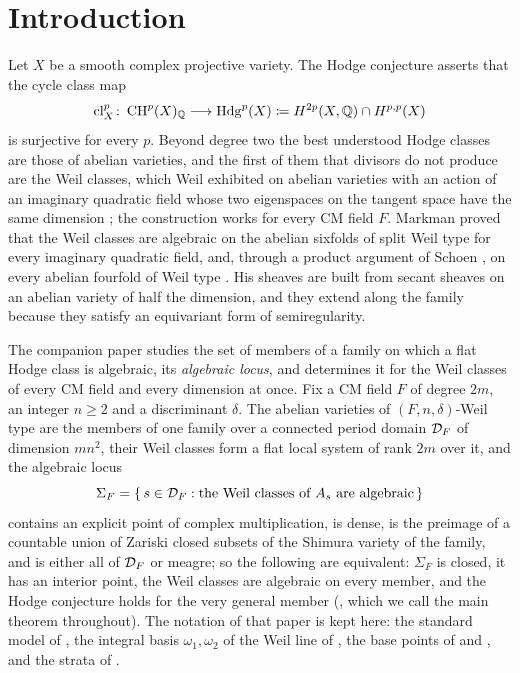 \section{Introduction}\label{sec:intro}

Let $X$ be a smooth complex projective variety. The Hodge conjecture asserts
that the cycle class map
\[
  \mathrm{cl}^{p}_{X}\colon \operatorname{CH}^{p}(X)_{\mathbb{Q}}\longrightarrow \mathrm{Hdg}^{p}(X)
  \coloneqq H^{2p}(X,\mathbb{Q})\cap H^{p,p}(X)
\]
is surjective for every $p$. Beyond degree two the best understood Hodge
classes are those of abelian varieties, and the first of them that divisors
do not produce are the Weil classes, which Weil exhibited on abelian
varieties with an action of an imaginary quadratic field whose two
eigenspaces on the tangent space have the same dimension \cite{Weil77}; the
construction works for every CM field $F$. Markman proved that the Weil
classes are algebraic on the abelian sixfolds of split Weil type for every
imaginary quadratic field, and, through a product argument of Schoen
\cite[Proposition~10]{Sch98}, on every abelian fourfold of Weil type
\cite{Mar25a,Mar25b}. His sheaves are built from secant sheaves on an abelian
variety of half the dimension, and they extend along the family because they
satisfy an equivariant form of semiregularity.

The companion paper \cite{paperI} studies the set of members of a family on
which a flat Hodge class is algebraic, its \emph{algebraic locus}, and
determines it for the Weil classes of every CM field and every dimension at
once. Fix a CM field $F$ of degree $2m$, an integer $n\ge2$ and a
discriminant $\delta$. The abelian varieties of $(F,n,\delta)$-Weil type are
the members of one family over a connected period domain $\mathcal{D}_{F}$ of
dimension $mn^{2}$, their Weil classes form a flat local system of rank $2m$
over it, and the algebraic locus
\[
  \Sigma_{F}=\{\,s\in\mathcal{D}_{F}:\text{the Weil classes of }A_{s}\text{ are
  algebraic}\,\}
\]
contains an explicit point of complex multiplication, is dense, is the
preimage of a countable union of Zariski closed subsets of the Shimura
variety of the family, and is either all of $\mathcal{D}_{F}$ or meagre; so the
following are equivalent: $\Sigma_{F}$ is closed, it has an interior point,
the Weil classes are algebraic on every member, and the Hodge conjecture
holds for the very general member (\cite[Theorem~1.1]{paperI}, which we call the main
theorem throughout). The notation of that paper is kept here: the standard
model of \cite[Section~4]{paperI}, the integral basis $\omega_{1},\omega_{2}$ of
the Weil line of \cite[Theorem~4.9]{paperI}, the base points of
\cite[Theorem~15.27]{paperI} and \cite[Theorem~17.5]{paperI}, and the strata of
\cite[Theorem~16.4]{paperI}.

